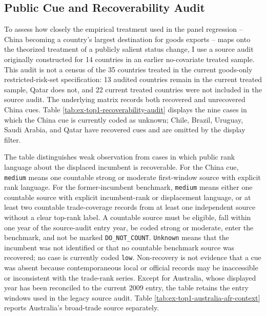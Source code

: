 \documentclass[referee,pdflatex,sn-basic]{sn-jnl}
\theoremstyle{thmstylethree}
\begin{document}
\clearpage

\subsection*{Public Cue and Recoverability Audit}\label{public-cue-and-recoverability-audit}

To assess how closely the empirical treatment used in the panel regression -- China becoming a country's largest destination for goods exports -- maps onto the theorized treatment of a publicly salient status change, I use a source audit originally constructed for 14 countries in an earlier no-covariate treated sample. This audit is not a census of the 35 countries treated in the current goods-only restricted-risk-set specification: 13 audited countries remain in the current treated sample, Qatar does not, and 22 current treated countries were not included in the source audit. The underlying matrix records both recovered and unrecovered China cues. Table \ref{tab:ex-top1-recoverability-audit} displays the nine cases in which the China cue is currently coded as unknown; Chile, Brazil, Uruguay, Saudi Arabia, and Qatar have recovered cues and are omitted by the display filter.

The table distinguishes weak observation from cases in which public rank language about the displaced incumbent is recoverable. For the China cue, \texttt{medium} means one countable strong or moderate first-window source with explicit rank language. For the former-incumbent benchmark, \texttt{medium} means either one countable source with explicit incumbent-rank or displacement language, or at least two countable trade-coverage records from at least one independent source without a clear top-rank label. A countable source must be eligible, fall within one year of the source-audit entry year, be coded strong or moderate, enter the benchmark, and not be marked \texttt{DO\_NOT\_COUNT}. \texttt{Unknown} means that the incumbent was not identified or that no countable benchmark source was recovered; no case is currently coded \texttt{low}. Non-recovery is not evidence that a cue was absent because contemporaneous local or official records may be inaccessible or inconsistent with the trade-rank series. Except for Australia, whose displayed year has been reconciled to the current 2009 entry, the table retains the entry windows used in the legacy source audit. Table \ref{tab:ex-top1-australia-afr-context} reports Australia's broad-trade source separately.
\end{document}
